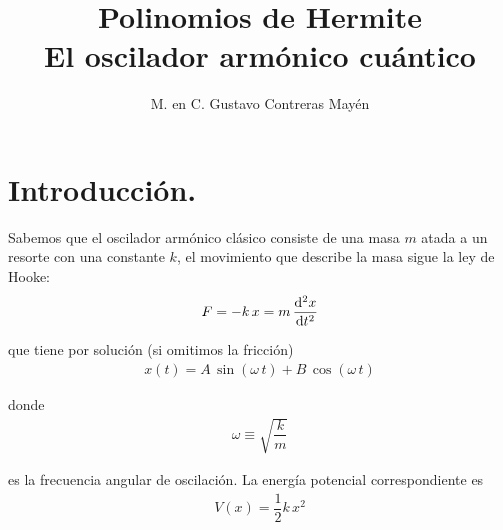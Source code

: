 
\title{Polinomios de Hermite \\ \large{El oscilador armónico cuántico}} \vspace{-3ex}
\author{M. en C. Gustavo Contreras Mayén}
\date{ }
\newcommand{\Cancel}[2][black]{{\color{#1}\cancel{\color{black}#2}}}

\vspace{-4cm}
\maketitle
\fontsize{14}{14}\selectfont
\tableofcontents
\newpage

\section{Introducción.}

Sabemos que el oscilador armónico clásico consiste de una masa $m$ atada a un resorte con una constante $k$, el movimiento que describe la masa sigue la ley de Hooke:
\begin{align*}
F = - k \, x = m \, \dv[2]{x}{t}
\end{align*}

que tiene por solución (si omitimos la fricción)
\begin{align*}
x(t) = A \, \sin (\omega \, t) + B \, \cos (\omega \, t)
\end{align*}

donde
\begin{align}
\omega \equiv \sqrt{\dfrac{k}{m}}
\label{eq:ecuacion_02_036}
\end{align}

es la frecuencia angular de oscilación. La energía potencial correspondiente es
\begin{align}
V(x) = \dfrac{1}{2} k \, x^{2}
\label{eq:ecuacion_02_037}
\end{align}

